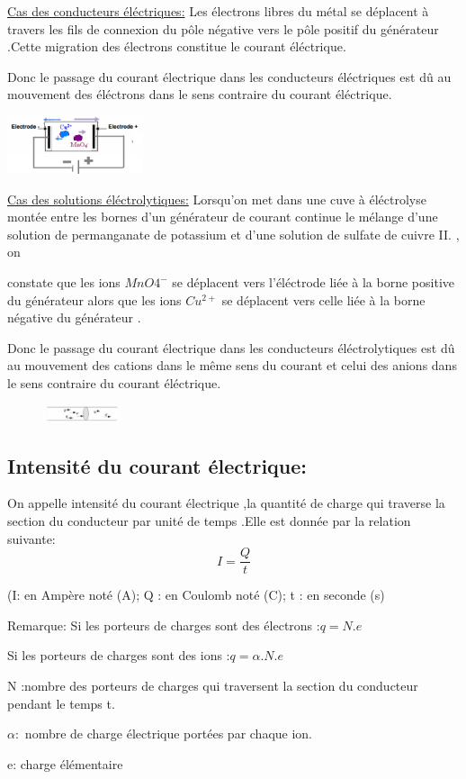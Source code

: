 \documentclass[12pt]{article}
\begin{document}
\underline{Cas des conducteurs éléctriques:} Les électrons libres du métal se déplacent à travers les fils de connexion du pôle négative
vers le pôle positif du générateur .Cette migration des électrons constitue le courant éléctrique.

Donc le passage du courant électrique dans les conducteurs éléctriques est dû au mouvement des éléctrons
dans le sens contraire du courant éléctrique.
\begin{center}
\includegraphics[width=0.3\textwidth]{./img/img_03.png}
\end{center}
\underline{ Cas des solutions éléctrolytiques:} Lorsqu'on met dans une cuve à éléctrolyse montée entre les bornes d'un générateur de
courant continue le mélange d'une solution de permanganate de potassium et d'une solution de sulfate de cuivre II. , on

constate que les ions $MnO4^-$
se déplacent vers l'éléctrode liée à la borne positive du générateur alors que les ions $Cu^{2+}$ se déplacent vers celle liée à la borne négative du générateur .

Donc le passage du courant électrique dans les conducteurs éléctrolytiques est dû au mouvement des cations
dans le même sens du courant et celui des anions dans le sens contraire du courant éléctrique.

\begin{figure}
\includegraphics[width=0.2\textwidth]{./img/img_04.png}
\end{figure}


\subsection{Intensité du courant électrique:}
On appelle intensité du courant électrique ,la quantité de charge qui traverse la section du conducteur par unité de temps .Elle
est donnée par la relation suivante:$$I=\frac{Q}{t}$$

(I: en Ampère noté (A); Q : en Coulomb noté (C); t : en seconde (s)

\begin{tcolorbox}
Remarque: Si les porteurs de charges sont des électrons :$q=N.e$

Si les porteurs de charges sont des ions :$q=\alpha.N.e$

    N :nombre des porteurs de charges qui traversent la section du conducteur pendant le temps t.

$\alpha:$ nombre de charge électrique portées par chaque ion.

e: charge élémentaire
\end{tcolorbox}
\end{document}

